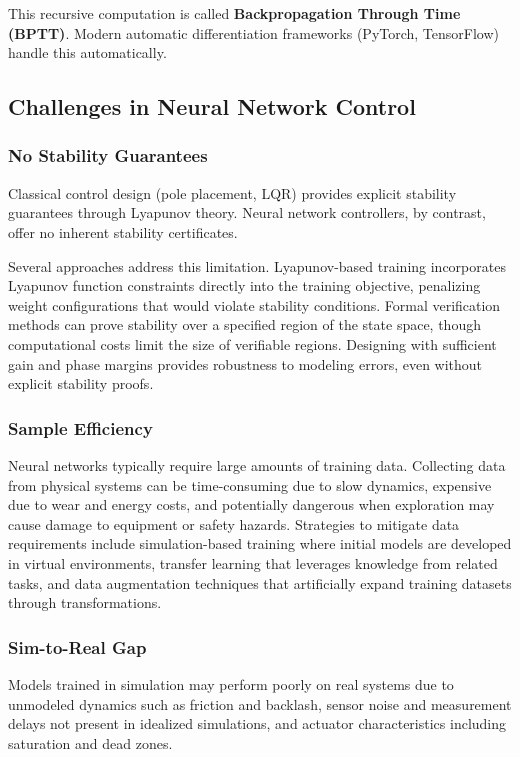 This recursive computation is called \textbf{Backpropagation Through Time (BPTT)}. Modern automatic differentiation frameworks (PyTorch, TensorFlow) handle this automatically.

\subsection{Challenges in Neural Network Control}

\subsubsection{No Stability Guarantees}

Classical control design (pole placement, LQR) provides explicit stability guarantees through Lyapunov theory. Neural network controllers, by contrast, offer no inherent stability certificates.

Several approaches address this limitation. Lyapunov-based training incorporates Lyapunov function constraints directly into the training objective, penalizing weight configurations that would violate stability conditions. Formal verification methods can prove stability over a specified region of the state space, though computational costs limit the size of verifiable regions. Designing with sufficient gain and phase margins provides robustness to modeling errors, even without explicit stability proofs.

\subsubsection{Sample Efficiency}

Neural networks typically require large amounts of training data. Collecting data from physical systems can be time-consuming due to slow dynamics, expensive due to wear and energy costs, and potentially dangerous when exploration may cause damage to equipment or safety hazards. Strategies to mitigate data requirements include simulation-based training where initial models are developed in virtual environments, transfer learning that leverages knowledge from related tasks, and data augmentation techniques that artificially expand training datasets through transformations.

\subsubsection{Sim-to-Real Gap}

Models trained in simulation may perform poorly on real systems due to unmodeled dynamics such as friction and backlash, sensor noise and measurement delays not present in idealized simulations, and actuator characteristics including saturation and dead zones.


